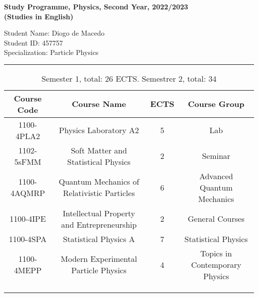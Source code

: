 \documentclass[11pt,letterpaper]{article}
\begin{document}
\pagestyle{plain}
 
\begin{center}\vspace{-1cm}
\textbf{\large Study Programme, Physics, Second Year, 2022/2023}\\
\textbf{(Studies in English)}
\end{center}

\begin{flushleft}
Student Name: Diogo de Macedo\\
Student ID: 457757 \\
Specialization: Particle Physics
\rule{\linewidth}{0.1mm}

\begin{table} [htbp!]
\centering
\caption{Semester 1, total: 26 ECTS. Semestrer 2, total: 34}
\begin{tabular}{c|c|c|c|}
\textbf{Course Code} & \textbf{Course Name}                        & \textbf{ECTS}        & \textbf{Course Group}           \\ 
\hline
1100-4PLA2           & Physics Laboratory A2                       & 5                    & Lab                             \\
1102-5sFMM           & Soft Matter and Statistical Physics         & 2                    & Seminar                         \\
1100-4AQMRP          & Quantum Mechanics of Relativistic Particles & 6                    & Advanced Quantum Mechanics      \\
1100-4IPE            & Intellectual Property and Entrepreneurship  & 2                    & General Courses          \\
1100-4SPA            & Statistical Physics A                       & 7                    & Statistical Physics             \\
1100-4MEPP           & Modern Experimental Particle Physics        & 4                    & Topics in Contemporary Physics  \\
\multicolumn{1}{l}{} & \multicolumn{1}{l}{}                        & \multicolumn{1}{l}{} & \multicolumn{1}{l}{}            \\
\multicolumn{1}{l}{} & \multicolumn{1}{l}{}                        & \multicolumn{1}{l}{} & \multicolumn{1}{l}{}            \\
\multicolumn{1}{l}{} & \multicolumn{1}{l}{}                        & \multicolumn{1}{l}{} & \multicolumn{1}{l}{}            \\

\end{tabular}
\end{table}
\end{flushleft}
\end{document}
